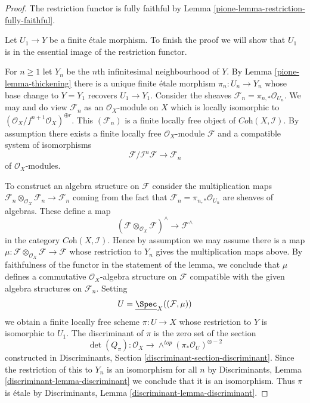 \begin{proof}

The restriction functor is fully faithful by
Lemma \ref{pione-lemma-restriction-fully-faithful}.

\medskip\noindent
Let $U_1 \to Y$ be a finite \'etale morphism. To finish the proof
we will show that $U_1$ is in the essential image of the
restriction functor.

\medskip\noindent
For $n \geq 1$ let $Y_n$ be the $n$th infinitesimal neighbourhood of $Y$.
By Lemma \ref{pione-lemma-thickening}
there is a unique finite \'etale morphism
$\pi_n : U_n \to Y_n$ whose base change to $Y = Y_1$
recovers $U_1 \to Y_1$.
Consider the sheaves $\mathcal{F}_n = \pi_{n, *}\mathcal{O}_{U_n}$.
We may and do view $\mathcal{F}_n$ as an $\mathcal{O}_X$-module on $X$
which is locally isomorphic to
$(\mathcal{O}_X/f^{n + 1}\mathcal{O}_X)^{\oplus r}$.
This $(\mathcal{F}_n)$ is a finite locally free object of
$\textit{Coh}(X, \mathcal{I})$.
By assumption there exists a finite locally free $\mathcal{O}_X$-module
$\mathcal{F}$ and a compatible system of isomorphisms
$$
\mathcal{F}/\mathcal{I}^n\mathcal{F} \to \mathcal{F}_n
$$
of $\mathcal{O}_X$-modules.

\medskip\noindent
To construct an algebra structure on $\mathcal{F}$ consider the multiplication
maps
$\mathcal{F}_n \otimes_{\mathcal{O}_X} \mathcal{F}_n \to \mathcal{F}_n$
coming from the fact that $\mathcal{F}_n = \pi_{n, *}\mathcal{O}_{U_n}$
are sheaves of algebras. These define a map
$$
(\mathcal{F}\otimes_{\mathcal{O}_X} \mathcal{F})^\wedge
\longrightarrow
\mathcal{F}^\wedge
$$
in the category $\textit{Coh}(X, \mathcal{I})$. Hence by assumption
we may assume there is a map
$\mu : \mathcal{F}\otimes_{\mathcal{O}_X} \mathcal{F} \to \mathcal{F}$
whose restriction to $Y_n$ gives the multiplication maps above.
By faithfulness of the functor in the statement of the lemma,
we conclude that $\mu$ defines a commutative $\mathcal{O}_X$-algebra
structure on $\mathcal{F}$ compatible with the given algebra
structures on $\mathcal{F}_n$.
Setting
$$
U = \underline{\Spec}_X((\mathcal{F}, \mu))
$$
we obtain a finite locally free scheme $\pi : U \to X$ whose restriction
to $Y$ is isomorphic to $U_1$. The discriminant of $\pi$ is the zero
set of the section
$$
\det(Q_\pi) :
\mathcal{O}_X
\longrightarrow
\wedge^{top}(\pi_*\mathcal{O}_U)^{\otimes -2}
$$
constructed in
Discriminants, Section \ref{discriminant-section-discriminant}.
Since the restriction of this to $Y_n$ is an isomorphism for all $n$
by Discriminants, Lemma \ref{discriminant-lemma-discriminant}
we conclude that it is an isomorphism. Thus $\pi$ is \'etale by
Discriminants, Lemma \ref{discriminant-lemma-discriminant}.
\end{proof}

